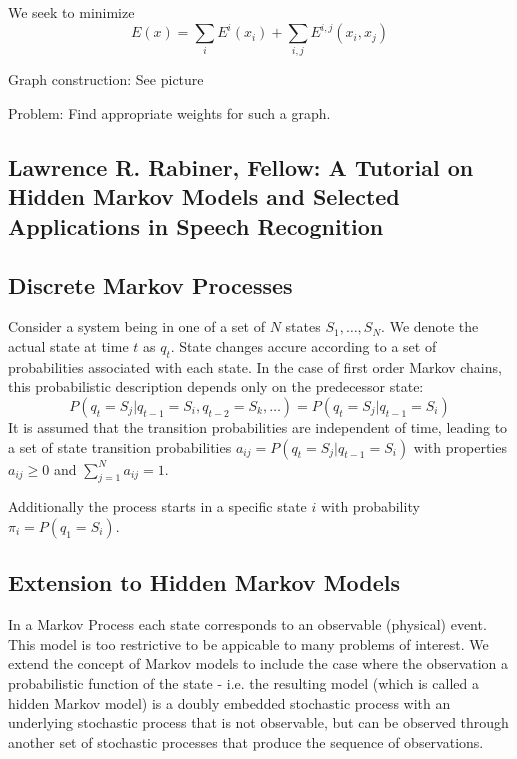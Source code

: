 \documentclass{scrartcl}
\begin{document}
We seek to minimize
\[E(x) = \sum_i E^i(x_i) + \sum_{i,j} E^{i,j} (x_i, x_j)\]

Graph construction:
See picture

Problem: Find appropriate weights for such a graph.
\newpage
\begin{appendices}

\section{Lawrence R. Rabiner, Fellow: A Tutorial on Hidden Markov Models and Selected Applications in Speech Recognition}
\subsection{Discrete Markov Processes}
Consider a system being in one of a set of \(N\) states \(S_1, \dots, S_N\). We denote the actual state at time \(t\) as \(q_t\). State changes accure according to a set of probabilities associated with each state. In the case of first order Markov chains, this probabilistic description depends only on the predecessor state:
\[P(q_t = S_j | q_{t-1} = S_i, q_{t-2} = S_k, \dots) = P(q_t = S_j | q_{t-1} = S_i)\]
It is assumed that the transition probabilities are independent of time, leading to a set of state transition probabilities \(a_{ij} = P(q_t = S_j | q_{t-1} = S_i)\) with properties \(a_{ij} \geq 0\) and \(\sum_{j=1}^N a_{ij} = 1\).

Additionally the process starts in a specific state \(i\) with probability \(\pi_i = P(q_1 = S_i)\).

\subsection{Extension to Hidden Markov Models}
In a Markov Process each state corresponds to an observable (physical) event. This model is too restrictive to be appicable to many problems of interest. We extend the concept of Markov models to include the case where the observation a probabilistic function of the state - i.e. the resulting model (which is called a hidden Markov model) is a doubly embedded stochastic process with an underlying stochastic process that is not observable, but can be observed through another set of stochastic processes that produce the sequence of observations. 


\end{appendices}
\end{document}
